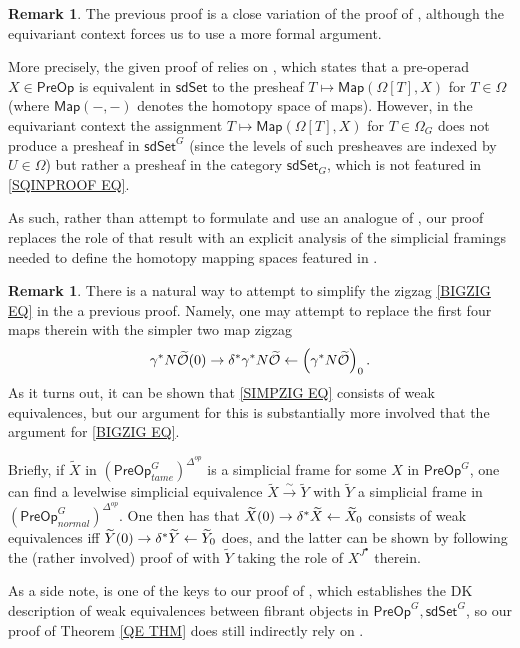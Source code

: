 \documentclass[a4paper,10pt
,draft
]{article}%
\numberwithin{equation}{section}
\numberwithin{figure}{section}
\theoremstyle{definition} %
\newtheorem{remark}[equation]{Remark}%
\renewcommand{\O}{\ensuremath{\mathcal O}}
\newcommand{\1}{\ensuremath{\mathbbm 1}}%
\begin{document}
\begin{remark}
	The previous proof is a close variation of 
	the proof of \cite[Thm. 8.14]{CM13b},
	although the equivariant context 
	forces us to use a more formal argument.
	
	More precisely, the given proof of \cite[Thm. 8.14]{CM13b}
	relies on 
	\cite[Thm 5.9(v)]{CM13b},
	which states that a pre-operad
	$X \in \mathsf{PreOp}$
	is equivalent in $\mathsf{sdSet}$
	to the presheaf
	$T \mapsto \mathsf{Map}(\Omega[T],X)$
	for $T \in \Omega$
	(where $\mathsf{Map}(-,-)$
	denotes the homotopy space of maps).
	However, in the equivariant context
	the assignment 
	$T \mapsto \mathsf{Map}(\Omega[T],X)$
	for $T \in \Omega_G$
	does not produce a presheaf in 
	$\mathsf{sdSet}^G$
	(since the levels of such presheaves are indexed by
	$U \in \Omega$)
	but rather a presheaf in the category
	$\mathsf{sdSet}_G$,
	which is not featured in 
	\eqref{SQINPROOF EQ}.
	
	As such, rather than attempt to formulate and use
	an analogue of \cite[Thm 5.9(v)]{CM13b},
	our proof replaces the role of that result with 
	an explicit analysis of the simplicial framings
	needed to define the homotopy mapping spaces
	featured in \cite[Thm 5.9(v)]{CM13b}.
\end{remark}



\begin{remark}
	There is a natural way to attempt to simplify the zigzag
	\eqref{BIGZIG EQ}
	in the a previous proof. 
	Namely, one may attempt to replace the first four maps therein
	with the simpler two map zigzag
\begin{equation}\label{SIMPZIG EQ}
	\gamma^{\**} N \widetilde{\O}(0)
\to 
	\delta^{\**} \gamma^{\**} N \widetilde{\O}
\leftarrow
	\left(\gamma^{\**} N \widetilde{\O}\right)_0.
\end{equation}
As it turns out, it can be shown that 
\eqref{SIMPZIG EQ} consists of weak equivalences, 
but our argument for this is substantially more involved that the argument for \eqref{BIGZIG EQ}.

Briefly, if $\widetilde{X}$
in $\left(\mathsf{PreOp}^G_{tame}\right)^{\Delta^{op}}$
is a simplicial frame for some $X$ in 
$\mathsf{PreOp}^G$,
one can find a levelwise simplicial equivalence
$\widetilde{X} \xrightarrow{\sim} \widetilde{Y}$
with $\widetilde{Y}$
a simplicial frame in
$\left(\mathsf{PreOp}^G_{normal}\right)^{\Delta^{op}}$.
One then has that 
$\widetilde{X}(0) \to \delta^{\**}\widetilde{X} \leftarrow \widetilde{X}_0$ 
consists of weak equivalences iff
$\widetilde{Y}(0) \to \delta^{\**}\widetilde{Y} \leftarrow \widetilde{Y}_0$ does,
and the latter can be shown by following the
(rather involved) proof of 
\cite[Prop. 5.41]{BP_edss}
with $\widetilde{Y}$ taking the role
of $X^{J^{\bullet}}$ therein.

As a side note, 
\cite[Prop. 5.41]{BP_edss} is one of the keys to our proof of
\cite[Thm. 5.48]{BP_edss}, 
which establishes the DK description of weak equivalences between fibrant objects in
$\mathsf{PreOp}^G,\mathsf{sdSet}^G$,
so our proof of Theorem \ref{QE THM}
does still indirectly rely on \cite[Prop. 5.41]{BP_edss}.
\end{remark}
\end{document}

